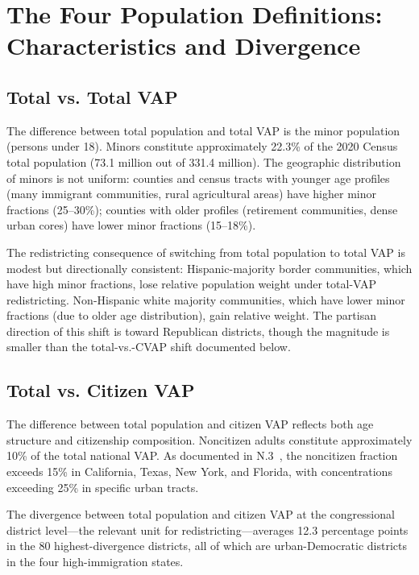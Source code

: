 \section{The Four Population Definitions: Characteristics and Divergence}
\label{sec:four_definitions}

\subsection{Total vs. Total VAP}

The difference between total population and total VAP is the minor population (persons under 18). Minors constitute approximately 22.3\% of the 2020 Census total population (73.1 million out of 331.4 million). The geographic distribution of minors is not uniform: counties and census tracts with younger age profiles (many immigrant communities, rural agricultural areas) have higher minor fractions (25--30\%); counties with older profiles (retirement communities, dense urban cores) have lower minor fractions (15--18\%).

The redistricting consequence of switching from total population to total VAP is modest but directionally consistent: Hispanic-majority border communities, which have high minor fractions, lose relative population weight under total-VAP redistricting. Non-Hispanic white majority communities, which have lower minor fractions (due to older age distribution), gain relative weight. The partisan direction of this shift is toward Republican districts, though the magnitude is smaller than the total-vs.-CVAP shift documented below.

\subsection{Total vs. Citizen VAP}

The difference between total population and citizen VAP reflects both age structure and citizenship composition. Noncitizen adults constitute approximately 10\% of the total national VAP. As documented in N.3~\citep{dellalibera2026n3}, the noncitizen fraction exceeds 15\% in California, Texas, New York, and Florida, with concentrations exceeding 25\% in specific urban tracts.

The divergence between total population and citizen VAP at the congressional district level---the relevant unit for redistricting---averages 12.3 percentage points in the 80 highest-divergence districts, all of which are urban-Democratic districts in the four high-immigration states.

